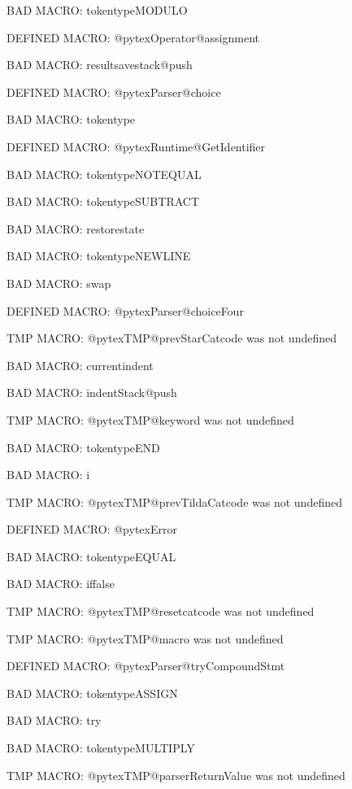 BAD MACRO: tokentypeMODULO

\ifx\@pytexOperator@assignment\undefined\else DEFINED MACRO: @pytexOperator@assignment
\fi

BAD MACRO: resultsavestack@push

\ifx\@pytexParser@choice\undefined\else DEFINED MACRO: @pytexParser@choice
\fi

BAD MACRO: tokentype

\ifx\@pytexRuntime@GetIdentifier\undefined\else DEFINED MACRO: @pytexRuntime@GetIdentifier
\fi

BAD MACRO: tokentypeNOTEQUAL

BAD MACRO: tokentypeSUBTRACT

BAD MACRO: restorestate

BAD MACRO: tokentypeNEWLINE

BAD MACRO: swap

\ifx\@pytexParser@choiceFour\undefined\else DEFINED MACRO: @pytexParser@choiceFour
\fi

\ifx\@pytexTMP@prevStarCatcode\undefined\else TMP MACRO: @pytexTMP@prevStarCatcode was not undefined
\fi

BAD MACRO: currentindent

BAD MACRO: indentStack@push

\ifx\@pytexTMP@keyword\undefined\else TMP MACRO: @pytexTMP@keyword was not undefined
\fi

BAD MACRO: tokentypeEND

BAD MACRO: i

\ifx\@pytexTMP@prevTildaCatcode\undefined\else TMP MACRO: @pytexTMP@prevTildaCatcode was not undefined
\fi

\ifx\@pytexError\undefined\else DEFINED MACRO: @pytexError
\fi

BAD MACRO: tokentypeEQUAL

BAD MACRO: iffalse

\ifx\@pytexTMP@resetcatcode\undefined\else TMP MACRO: @pytexTMP@resetcatcode was not undefined
\fi

\ifx\@pytexTMP@macro\undefined\else TMP MACRO: @pytexTMP@macro was not undefined
\fi

\ifx\@pytexParser@tryCompoundStmt\undefined\else DEFINED MACRO: @pytexParser@tryCompoundStmt
\fi

BAD MACRO: tokentypeASSIGN

BAD MACRO: try

BAD MACRO: tokentypeMULTIPLY

\ifx\@pytexTMP@parserReturnValue\undefined\else TMP MACRO: @pytexTMP@parserReturnValue was not undefined
\fi

